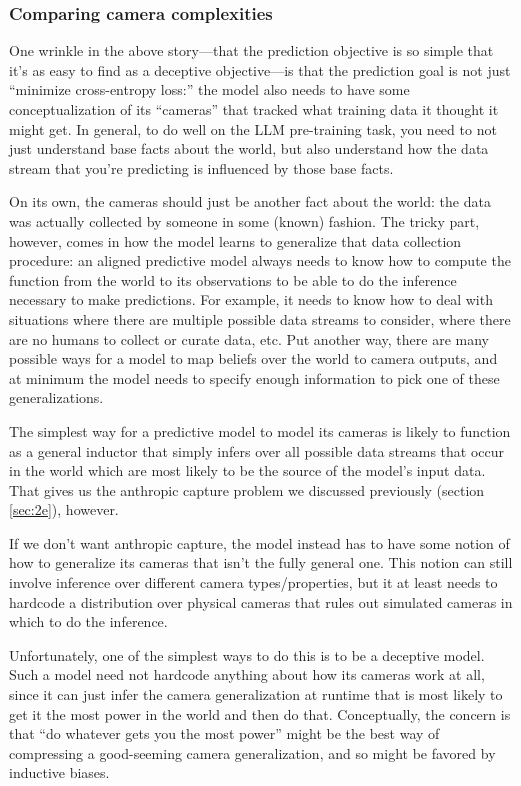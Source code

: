 \documentclass[
  onecolumn,
  natbib,
]{miri-tech-article}
\begin{document}
\subsubsection{Comparing camera complexities}

One wrinkle in the above story---that the prediction objective is so simple that it's as easy to find as a deceptive objective---is that the prediction goal is not just ``minimize cross-entropy loss:'' the model also needs to have some conceptualization of its ``cameras'' that tracked what training data it thought it might get. In general, to do well on the LLM pre-training task, you need to not just understand base facts about the world, but also understand how the data stream that you're predicting is influenced by those base facts.

On its own, the cameras should just be another fact about the world: the data was actually collected by someone in some (known) fashion. The tricky part, however, comes in how the model learns to generalize that data collection procedure: an aligned predictive model always needs to know how to compute the function from the world to its observations to be able to do the inference necessary to make predictions. For example, it needs to know how to deal with situations where there are multiple possible data streams to consider, where there are no humans to collect or curate data, etc. Put another way, there are many possible ways for a model to map beliefs over the world to camera outputs, and at minimum the model needs to specify enough information to pick one of these generalizations.

The simplest way for a predictive model to model its cameras is likely to function as a general inductor that simply infers over all possible data streams that occur in the world which are most likely to be the source of the model's input data. That gives us the anthropic capture problem we discussed previously (section \ref{sec:2e}), however.

If we don't want anthropic capture, the model instead has to have some notion of how to generalize its cameras that isn't the fully general one. This notion can still involve inference over different camera types/properties, but it at least needs to hardcode a distribution over physical cameras that rules out simulated cameras in which to do the inference.

Unfortunately, one of the simplest ways to do this is to be a deceptive model. Such a model need not hardcode anything about how its cameras work at all, since it can just infer the camera generalization at runtime that is most likely to get it the most power in the world and then do that. Conceptually, the concern is that ``do whatever gets you the most power'' might be the best way of compressing a good-seeming camera generalization, and so might be favored by inductive biases.
\end{document}
